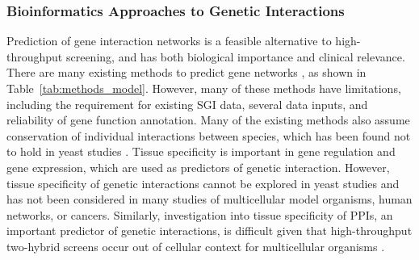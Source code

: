 \subsubsection{Bioinformatics Approaches to Genetic Interactions}

Prediction of gene interaction networks is a feasible alternative to high-throughput screening, and has both biological importance and clinical relevance. There are many existing methods to predict gene networks \citep{vanSteen2011, Boucher2013}, as shown in Table~\ref{tab:methods_model}. However, many of these methods have limitations, including the requirement for existing \gls{SGI} data, several data inputs, and reliability of gene function annotation. Many of the existing methods also assume conservation of individual interactions between species, which has been found not to hold in yeast studies \citep{Dixon2008}. Tissue specificity is important in gene regulation and \gls{gene expression}, which are used as predictors of genetic interaction. However, tissue specificity of genetic interactions cannot be explored in yeast studies and has not been considered in many studies of multicellular model organisms, human networks, or cancers. Similarly, investigation into tissue specificity of \glspl{PPI}, an important predictor of genetic interactions, is difficult given that high-throughput two-hybrid screens occur out of cellular context for multicellular organisms \citep{Bruckner2009}.  

